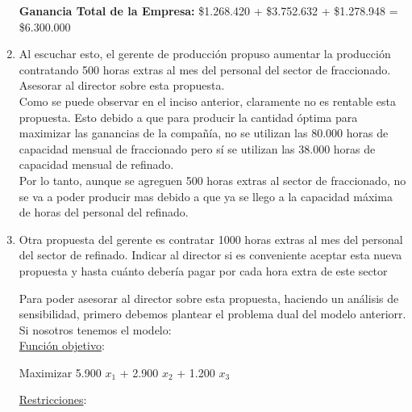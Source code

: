 \documentclass[10pt,a4paper]{article}
\begin{document}
\begin{enumerate}
    \vspace{0.5em}

    \textbf{Ganancia Total de la Empresa: } \$1.268.420 + \$3.752.632 + \$1.278.948 = \$6.300.000 \\

    \item Al escuchar esto, el gerente de producción propuso aumentar la producción contratando 500 horas extras al
    mes del personal del sector de fraccionado. Asesorar al director sobre esta propuesta.\\

    Como se puede observar en el inciso anterior, claramente no es rentable esta propuesta. Esto debido a que para producir
    la cantidad óptima para maximizar las ganancias de la compañía, no se utilizan las 80.000 horas de capacidad mensual de fraccionado pero sí se 
    utilizan las 38.000 horas de capacidad mensual de refinado. \\

    Por lo tanto, aunque se agreguen 500 horas extras al sector de fraccionado, no se va a poder producir mas debido a que ya se llego a la capacidad
    máxima de horas del personal del refinado.\\

    \item Otra propuesta del gerente es contratar 1000 horas extras al mes del personal del sector de refinado. Indicar
    al director si es conveniente aceptar esta nueva propuesta y hasta cuánto debería pagar por cada hora extra
    de este sector

    Para poder asesorar al director sobre esta propuesta, haciendo un análisis de sensibilidad, primero debemos plantear el problema 
    dual del modelo anteriorr.\\

    Si nosotros tenemos el modelo:\\

    \underline{Función objetivo}: 

    \begin{center}
        
        Maximizar 5.900 $x_{1}$ + 2.900 $x_{2}$ + 1.200 $x_{3}$

    \end{center}

    \clearpage

    \underline{Restricciones}: 

    \begin{itemize}


\end{itemize}
\end{enumerate}
\end{document}
